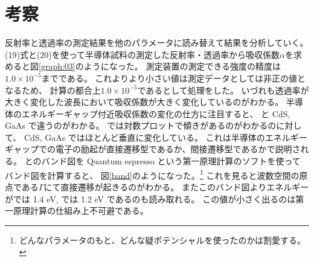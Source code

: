 \documentclass[11pt,dvipdfmx,a4paper]{jsarticle}
\begin{document}
\section{考察}
反射率と透過率の測定結果を他のパラメータに読み替えて結果を分析していく。
(19)式と(20)を使って半導体試料の測定した反射率・透過率から吸収係数\(\alpha\)を求めると図\ref{graph:03}のようになった。
測定装置の測定できる強度の精度は\(1.0\times10^{-5}\)までである。
これよりより小さい値は測定データとしては非正の値となるため、
計算の都合上\(1.0\times10^{-5}\)であるとして処理をした。
いづれも透過率が大きく変化した波長において吸収係数が大きく変化しているのがわかる。
半導体のエネルギーギャップ付近吸収係数の変化の仕方に注目すると、
 と CdS, GaAs で違うのがわかる。 では対数プロットで傾きがあるのがわかるのに対して、
CdS, GaAs ではほとんど垂直に変化している。
これは半導体のエネルギーギャップでの電子の励起が直接遷移型であるか、間接遷移型であるかで説明される。
とのバンド図を Quantum espresso という第一原理計算のソフトを使ってバンド図を計算すると、
図\ref{band}のようになった。\footnote{どんなパラメータのもと、どんな疑ポテンシャルを使ったのかは割愛する。}
これを見ると波数空間の原点である\(\Gamma\)にて直接遷移が起きるのがわかる。
またこのバンド図よりエネルギーがでは 1.4 eV, では 1.2 eV であるのも読み取れる。
この値が小さく出るのは第一原理計算の仕組み上不可避である。\cite{DFT}
\end{document}
